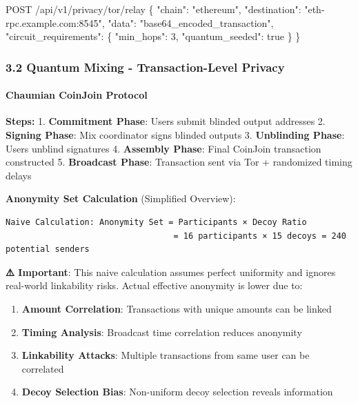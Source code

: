 \documentclass[
  11pt,
]{article}
\newenvironment{Shaded}{\begin{snugshade}}{\end{snugshade}}
\newcommand{\NormalTok}[1]{#1}
\providecommand{\tightlist}{%
  \setlength{\itemsep}{0pt}\setlength{\parskip}{0pt}}
\begin{document}
\begin{Shaded}
\begin{Highlighting}[]
\NormalTok{POST /api/v1/privacy/tor/relay}
\NormalTok{\{}
\NormalTok{  "chain": "ethereum",}
\NormalTok{  "destination": "eth{-}rpc.example.com:8545",}
\NormalTok{  "data": "base64\_encoded\_transaction",}
\NormalTok{  "circuit\_requirements": \{}
\NormalTok{    "min\_hops": 3,}
\NormalTok{    "quantum\_seeded": true}
\NormalTok{  \}}
\NormalTok{\}}
\end{Highlighting}
\end{Shaded}

\hypertarget{quantum-mixing---transaction-level-privacy}{%
\subsubsection{3.2 Quantum Mixing - Transaction-Level
Privacy}\label{quantum-mixing---transaction-level-privacy}}

\hypertarget{chaumian-coinjoin-protocol}{%
\paragraph{Chaumian CoinJoin
Protocol}\label{chaumian-coinjoin-protocol}}

\textbf{Steps:} 1. \textbf{Commitment Phase}: Users submit blinded
output addresses 2. \textbf{Signing Phase}: Mix coordinator signs
blinded outputs 3. \textbf{Unblinding Phase}: Users unblind signatures
4. \textbf{Assembly Phase}: Final CoinJoin transaction constructed 5.
\textbf{Broadcast Phase}: Transaction sent via Tor + randomized timing
delays

\textbf{Anonymity Set Calculation} (Simplified Overview):

\begin{verbatim}
Naive Calculation: Anonymity Set = Participants × Decoy Ratio
                                  = 16 participants × 15 decoys = 240 potential senders
\end{verbatim}

\textbf{⚠️ Important}: This naive calculation assumes perfect uniformity
and ignores real-world linkability risks. Actual effective anonymity is
lower due to:

\begin{enumerate}
\def\labelenumi{\arabic{enumi}.}
\tightlist
\item
  \textbf{Amount Correlation}: Transactions with unique amounts can be
  linked
\item
  \textbf{Timing Analysis}: Broadcast time correlation reduces anonymity
\item
  \textbf{Linkability Attacks}: Multiple transactions from same user can
  be correlated
\item
  \textbf{Decoy Selection Bias}: Non-uniform decoy selection reveals
  information
\end{enumerate}
\end{document}
